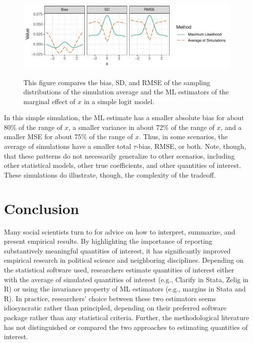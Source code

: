 \documentclass[11pt]{article}
\begin{document}
\begin{figure}[h!]
\begin{center}
\includegraphics[scale = 0.75]{figs/logit-mse-me.pdf}\\
\vspace{.1in}
\caption{This figure compares the bias, SD, and RMSE of the sampling distributions of the simulation average and the ML estimators of the marginal effect of $x$ in a simple logit model.}\label{fig:logit-mse-me}
\end{center}
\end{figure}

\noindent In this simple simulation, the ML estimate has a smaller absolute bias for about 80\% of the range of $x$, a smaller variance in about 72\% of the range of $x$, and a smaller MSE for about 75\% of the range of $x$. Thus, in some scenarios, the average of simulations have a smaller total $\tau$-bias, RMSE, or both. Note, though, that these patterns do not necessarily generalize to other scenarios, including other statistical models, other true coefficients, and other quantities of interest. These simulations do illustrate, though, the complexity of the tradeoff.

\section*{Conclusion}

Many social scientists turn to \cite{KingTomzWittenberg2000} for advice on how to interpret, summarize, and present empirical results. By highlighting the importance of reporting substantively meaningful quantities of interest, it has significantly improved empirical research in political science and neighboring disciplines. Depending on the statistical software used, researchers estimate quantities of interest either with the average of simulated quantities of interest (e.g., Clarify in Stata, Zelig in R) or using the invariance property of ML estimators (e.g., margins in Stata and R). In practice, researchers' choice between these two estimators seems idiosyncratic rather than principled, depending on their preferred software package rather than any statistical criteria. Further, the methodological literature has not distinguished or compared the two approaches to estimating quantities of interest.
\end{document}
